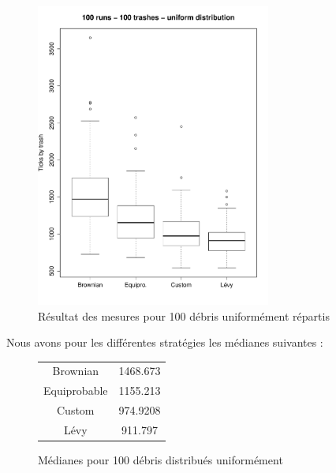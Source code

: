 
\begin{figure}[H]
	\begin{center}
		\includegraphics[height=10cm]{diagrams/100TrRnd_all.pdf}
		\caption{Résultat des mesures pour 100 débris uniformément répartis}
		\label{fig:100Trashes_Rnd}
	\end{center}
\end{figure}

Nous avons pour les différentes stratégies les médianes suivantes :

\begin{figure}[H]
	\begin{center}
		\begin{tabular}{ | c | c | }
			\hline
			Brownian & 1468.673 \\
			Equiprobable & 1155.213 \\
			Custom & 974.9208 \\
			Lévy & 911.797 \\
			\hline
		\end{tabular}
		\caption{Médianes pour 100 débris distribués uniformément}
	\end{center}
\end{figure}
